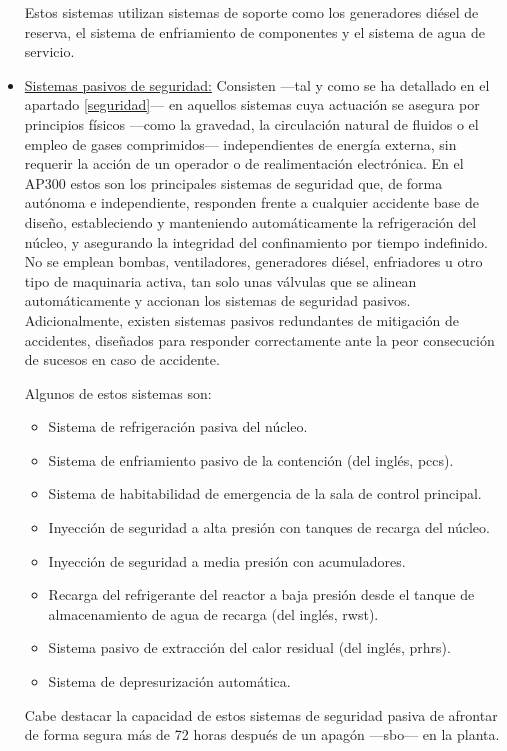 \begin{itemize}
Estos sistemas utilizan sistemas de soporte como los generadores diésel de reserva, el sistema de enfriamiento de componentes y el sistema de agua de servicio. 
  
  \item \underline{Sistemas pasivos de seguridad:} Consisten ---tal y como se ha detallado en el apartado \ref{seguridad}--- en aquellos sistemas cuya actuación se asegura por principios físicos ---como la gravedad, la circulación natural de fluidos o el empleo de gases comprimidos--- independientes de energía externa, sin requerir la acción de un operador o de realimentación electrónica.
  En el AP300 estos son los principales sistemas de seguridad que, de forma autónoma e independiente, responden frente a cualquier accidente base de diseño, estableciendo y manteniendo automáticamente la refrigeración del núcleo, y asegurando la integridad del confinamiento por tiempo indefinido. No se emplean bombas, ventiladores, generadores diésel, enfriadores u otro tipo de maquinaria activa, tan solo unas válvulas que se alinean automáticamente y accionan los sistemas de seguridad pasivos.
  Adicionalmente, existen sistemas pasivos redundantes de mitigación de accidentes, diseñados para responder correctamente ante la peor consecución de sucesos en caso de accidente.
  
  Algunos de estos sistemas son:
  \begin{itemize}
    \item Sistema de refrigeración pasiva del núcleo.
    \item Sistema de enfriamiento pasivo de la contención (del inglés, \acrshort{pccs}).
    \item Sistema de habitabilidad de emergencia de la sala de control principal.
    \item Inyección de seguridad a alta presión con tanques de recarga del núcleo.
    \item Inyección de seguridad a media presión con acumuladores.
    \item Recarga del refrigerante del reactor a baja presión desde el tanque de almacenamiento de agua de recarga (del inglés, \acrshort{rwst}).
    \item Sistema pasivo de extracción del calor residual (del inglés, \acrshort{prhrs}).
    \item Sistema de depresurización automática.
  \end{itemize}
  
  Cabe destacar la capacidad de estos sistemas de seguridad pasiva de afrontar de forma segura más de 72 horas después de un apagón ---\acrfull{sbo}--- en la planta.


\end{itemize}
